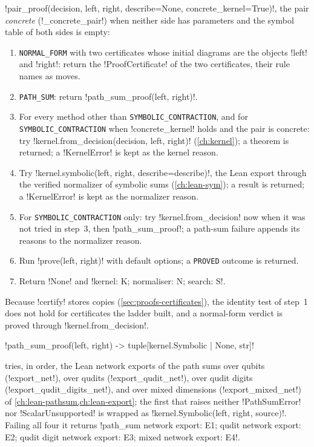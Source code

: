\begin{algorithm}\label{alg:proofs-pair-proof}
\py!pair_proof(decision, left, right, describe=None, concrete_kernel=True)!, the pair \emph{concrete} (\py!_concrete_pair!) when neither side has parameters and the symbol table of both sides is empty:
\begin{enumerate}
\item \texttt{NORMAL\_FORM} with two certificates whose initial diagrams are the objects \py!left! and \py!right!: return the \py!ProofCertificate! of the two certificates, their rule names as moves.
\item \texttt{PATH\_SUM}: return \py!path_sum_proof(left, right)!.
\item For every method other than \texttt{SYMBOLIC\_CONTRACTION}, and for \texttt{SYMBOLIC\_CONTRACTION} when \py!concrete_kernel! holds and the pair is concrete: try \py!kernel.from_decision(decision, left, right)! (\cref{ch:kernel}); a theorem is returned; a \py!KernelError! is kept as the kernel reason.
\item Try \py!kernel.symbolic(left, right, describe=describe)!, the Lean export through the verified normalizer of symbolic sums (\cref{ch:lean-sym}); a result is returned; a \py!KernelError! is kept as the normalizer reason.
\item For \texttt{SYMBOLIC\_CONTRACTION} only: try \py!kernel.from_decision! now when it was not tried in step~3, then \py!path_sum_proof!; a path-sum failure appends its reasons to the normalizer reason.
\item Run \py!prove(left, right)! with default options; a \texttt{PROVED} outcome is returned.
\item Return \py!None! and \code!kernel: K; normaliser: N; search: S!.
\end{enumerate}
\end{algorithm}

Because \py!certify! stores copies (\cref{sec:proofs-certificates}), the identity test of step~1 does not hold for certificates the ladder built, and a normal-form verdict is proved through \py!kernel.from_decision!.

\begin{signature}
\py!path_sum_proof(left, right) -> tuple[kernel.Symbolic | None, str]!
\end{signature}
tries, in order, the Lean network exports of the path sums over qubits (\py!export_net!), over qudits (\py!export_qudit_net!), over qudit digits (\py!export_qudit_digits_net!), and over mixed dimensions (\py!export_mixed_net!) of \cref{ch:lean-pathsum,ch:lean-export}; the first that raises neither \py!PathSumError! nor \py!ScalarUnsupported! is wrapped as \py!kernel.Symbolic(left, right, source)!. Failing all four it returns \code!path_sum network export: E1; qudit network export: E2; qudit digit network export: E3; mixed network export: E4!.

